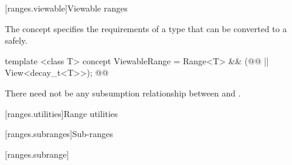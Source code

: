 \setcounter{subsection}{10}
[ranges.viewable]{Viewable ranges}

\pnum The  concept specifies the requirements of a 
type that can be converted to a  safely.

\begin{codeblock}
template <class T>
concept ViewableRange =
  Range<T> && (@@ || View<decay_t<T>>); @\removed{// \seebelow}@
\end{codeblock}

\begin{removedblock}
\pnum
There need not be any subsumption relationship between 
and .
\end{removedblock}

[ranges.utilities]{Range utilities}

\setcounter{subsection}{1}
[ranges.subranges]{Sub-ranges}

[ranges.subrange]{}

